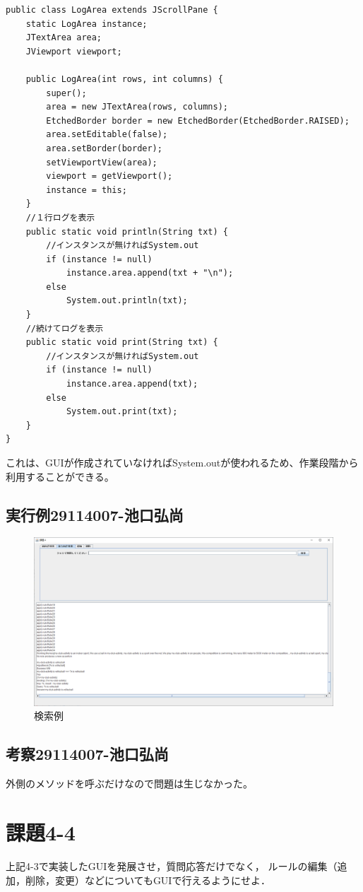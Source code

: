 \documentclass{jarticle}
\begin{document}
\begin{lstlisting}[caption=Log,label=src:log]
public class LogArea extends JScrollPane {
	static LogArea instance;
	JTextArea area;
	JViewport viewport;

	public LogArea(int rows, int columns) {
		super();
		area = new JTextArea(rows, columns);
		EtchedBorder border = new EtchedBorder(EtchedBorder.RAISED);
		area.setEditable(false);
		area.setBorder(border);
		setViewportView(area);
		viewport = getViewport();
		instance = this;
	}
	//１行ログを表示
	public static void println(String txt) {
    	//インスタンスが無ければSystem.out
		if (instance != null)
			instance.area.append(txt + "\n");
		else
			System.out.println(txt);
	}
	//続けてログを表示
	public static void print(String txt) {
    	//インスタンスが無ければSystem.out
		if (instance != null)
			instance.area.append(txt);
		else
			System.out.print(txt);
	}
}
\end{lstlisting}
これは、GUIが作成されていなければSystem.outが使われるため、作業段階から利用することができる。

\subsection{実行例29114007-池口弘尚}
\begin{figure}[!hbt]
  \centering
  \includegraphics[scale=0.25]{007/GUI1.png}
  \caption{検索例}
  \label{fig:Search}
\end{figure}
\subsection{考察29114007-池口弘尚}
外側のメソッドを呼ぶだけなので問題は生じなかった。

\section{課題4-4}
\begin{screen}
    上記4-3で実装したGUIを発展させ，質問応答だけでなく，
    ルールの編集（追加，削除，変更）などについてもGUIで行えるようにせよ．
\end{screen}
\end{document}
